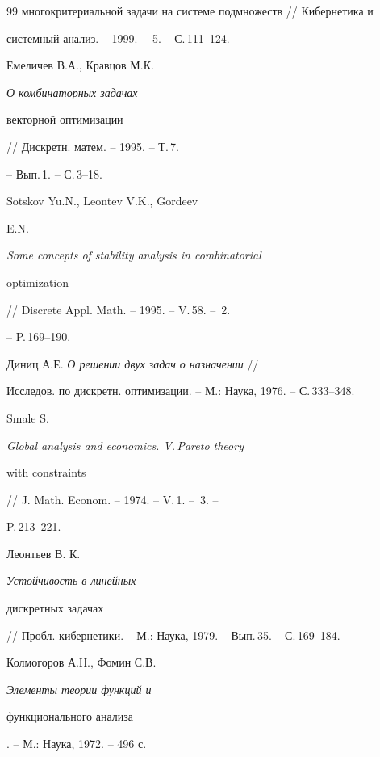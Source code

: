 \begin{thebibliography}{99}
{многокритериальной задачи на системе подмножеств} // Кибернетика и


системный анализ. -- 1999. -- \No\,5. -- С.\,111--124.







Емеличев В.А., Кравцов М.К. {\em О комбинаторных задачах


векторной оптимизации} // Дискретн. матем. -- 1995. -- Т.\,7.


-- Вып.\,1. -- С.\,3--18.







Sotskov Yu.N., Leontev V.K., Gordeev


E.N. {\em Some concepts of stability analysis in combinatorial


optimization} // Discrete Appl. Math. -- 1995. -- V.\,58. -- \No\,2.


-- P.\,169--190.







Диниц А.Е. {\em О решении двух задач о назначении} //


Исследов. по дискретн. оптимизации. -- М.: Наука, 1976. -- С.\,333--348.







Smale S. {\em Global analysis and economics. V.\,Pareto theory


with constraints} // J. Math. Econom. -- 1974. -- V.\,1. -- \No\,3. --


P.\,213--221.







Леонтьев В. К. {\em Устойчивость в линейных


дискретных задачах}


// Пробл. кибернетики. -- М.: Наука, 1979. -- Вып.\,35. -- С.\,169--184.







Колмогоров А.Н., Фомин С.В. {\em Элементы теории функций и


функционального анализа}. -- М.: Наука, 1972. -- 496 с.








\end{thebibliography}





\vskip 2cm












\label{end}





